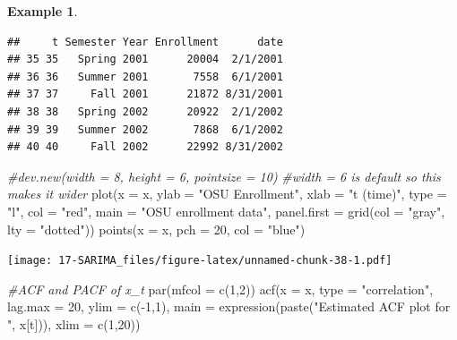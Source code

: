 \documentclass[
]{book}
\newenvironment{Shaded}{\begin{snugshade}}{\end{snugshade}}
\newcommand{\AttributeTok}[1]{\textcolor[rgb]{0.77,0.63,0.00}{#1}}
\newcommand{\CommentTok}[1]{\textcolor[rgb]{0.56,0.35,0.01}{\textit{#1}}}
\newcommand{\DecValTok}[1]{\textcolor[rgb]{0.00,0.00,0.81}{#1}}
\newcommand{\FunctionTok}[1]{\textcolor[rgb]{0.00,0.00,0.00}{#1}}
\newcommand{\NormalTok}[1]{#1}
\newcommand{\OtherTok}[1]{\textcolor[rgb]{0.56,0.35,0.01}{#1}}
\newcommand{\SpecialCharTok}[1]{\textcolor[rgb]{0.00,0.00,0.00}{#1}}
\newcommand{\StringTok}[1]{\textcolor[rgb]{0.31,0.60,0.02}{#1}}
\theoremstyle{definition}
\theoremstyle{definition}
\newtheorem{example}{Example}[chapter]
\theoremstyle{definition}
\theoremstyle{definition}
\theoremstyle{remark}
\begin{document}
\begin{example}
\begin{verbatim}
##     t Semester Year Enrollment      date
## 35 35   Spring 2001      20004  2/1/2001
## 36 36   Summer 2001       7558  6/1/2001
## 37 37     Fall 2001      21872 8/31/2001
## 38 38   Spring 2002      20922  2/1/2002
## 39 39   Summer 2002       7868  6/1/2002
## 40 40     Fall 2002      22992 8/31/2002
\end{verbatim}

\begin{Shaded}
\end{Shaded}

\begin{Shaded}
\begin{Highlighting}[]
\CommentTok{\#dev.new(width = 8, height = 6, pointsize = 10) }
\CommentTok{\#width = 6 is default so this makes it wider}
  \FunctionTok{plot}\NormalTok{(}\AttributeTok{x =}\NormalTok{ x, }\AttributeTok{ylab =} \StringTok{"OSU Enrollment"}\NormalTok{, }\AttributeTok{xlab =} \StringTok{"t (time)"}\NormalTok{, }\AttributeTok{type =} \StringTok{"l"}\NormalTok{, }\AttributeTok{col =} \StringTok{"red"}\NormalTok{,}
    \AttributeTok{main =} \StringTok{"OSU enrollment data"}\NormalTok{, }\AttributeTok{panel.first =} \FunctionTok{grid}\NormalTok{(}\AttributeTok{col =} \StringTok{"gray"}\NormalTok{, }\AttributeTok{lty =} \StringTok{"dotted"}\NormalTok{))}
  \FunctionTok{points}\NormalTok{(}\AttributeTok{x =}\NormalTok{ x, }\AttributeTok{pch =} \DecValTok{20}\NormalTok{, }\AttributeTok{col =} \StringTok{"blue"}\NormalTok{)}
\end{Highlighting}
\end{Shaded}

\texttt{[image: 17-SARIMA\_files/figure-latex/unnamed-chunk-38-1.pdf]}

\begin{Shaded}
\begin{Highlighting}[]
\CommentTok{\#ACF and PACF of x\_t}
\FunctionTok{par}\NormalTok{(}\AttributeTok{mfcol =} \FunctionTok{c}\NormalTok{(}\DecValTok{1}\NormalTok{,}\DecValTok{2}\NormalTok{))}
\FunctionTok{acf}\NormalTok{(}\AttributeTok{x =}\NormalTok{ x, }\AttributeTok{type =} \StringTok{"correlation"}\NormalTok{, }\AttributeTok{lag.max =} \DecValTok{20}\NormalTok{, }\AttributeTok{ylim =} 
    \FunctionTok{c}\NormalTok{(}\SpecialCharTok{{-}}\DecValTok{1}\NormalTok{,}\DecValTok{1}\NormalTok{), }\AttributeTok{main =} \FunctionTok{expression}\NormalTok{(}\FunctionTok{paste}\NormalTok{(}\StringTok{"Estimated ACF plot }
\StringTok{    for "}\NormalTok{, x[t])), }\AttributeTok{xlim =} \FunctionTok{c}\NormalTok{(}\DecValTok{1}\NormalTok{,}\DecValTok{20}\NormalTok{))}
\end{Highlighting}
\end{Shaded}


\end{example}
\end{document}

